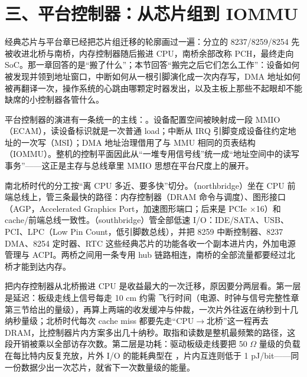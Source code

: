 \section{三、平台控制器：从芯片组到 IOMMU}

经典芯片与平台章已经把芯片组迁移的轮廓画过一遍：分立的 8237/8259/8254 先被收进北桥与南桥，内存控制器随后搬进 CPU，南桥余部改称 PCH，最终走向 SoC。那一章回答的是“搬了什么”；本节回答“搬完之后它们怎么工作”：设备如何被发现并领到地址窗口，中断如何从一根引脚演化成一次内存写，DMA 地址如何被再翻译一次，操作系统的心跳由哪颗定时器发出，以及主板上那些不起眼却不能缺席的小控制器各管什么。

\begin{keyidea}
平台控制器的演进有一条统一的主线：。设备配置空间被映射成一段 MMIO（ECAM），读设备标识就是一次普通 load；中断从 IRQ 引脚变成设备往约定地址的一次写（MSI）；DMA 地址治理借用了与 MMU 相同的页表结构（IOMMU）。整机的控制平面因此从“一堆专用信号线”统一成“地址空间中的读写事务”——这正是主存与总线章里 MMIO 思想在平台尺度上的展开。
\end{keyidea}


南北桥时代的分工按“离 CPU 多近、要多快”切分。（northbridge）坐在 CPU 前端总线上，管三条最快的路径：内存控制器（DRAM 命令与调度）、图形接口（AGP，Accelerated Graphics Port，加速图形端口；后来是 PCIe $\times$16）和 cache/前端总线一致性。（southbridge）管全部低速 I/O：IDE/SATA、USB、PCI、LPC（Low Pin Count，低引脚数总线），并把 8259 中断控制器、8237 DMA、8254 定时器、RTC 这些经典芯片的功能各收一个副本进片内，外加电源管理与 ACPI。两桥之间用一条专用 hub 链路相连，南桥的全部流量都要经过北桥才能到达内存。

把内存控制器从北桥搬进 CPU 是收益最大的一次迁移，原因要分两层看。第一层是延迟：板级走线上信号每走 10 cm 约需  飞行时间（电源、时钟与信号完整性章第三节给出的量级），再算上两端的收发缓冲与仲裁，一次片外往返在纳秒到十几纳秒量级；北桥时代每次 cache miss 都要先走“CPU$\to$北桥”这一程再去 DRAM，比控制器片内方案多出几十纳秒。取指和读数是整机最频繁的路径，这段开销被乘以全部访存次数。第二层是功耗：驱动板级走线要把 50 $\Omega$ 量级的负载在每比特内反复充放，片外 I/O 的能耗典型在 ，片内互连则低于 1 pJ/bit——同一份数据少出一次芯片，就省下一次数量级的能量。

